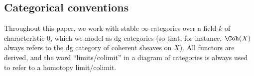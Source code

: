 \subsection*{Categorical conventions}
Throughout this paper, we work with stable $\infty$-categories over a field $k$ of characteristic 0, which we model as dg categories (so that, for instance, $\Coh(X)$ always refers to the dg category of coherent sheaves on $X$). All functors are derived, and the word ``limits/colimit'' in a diagram of categories is always used to refer to a homotopy limit/colimit.
